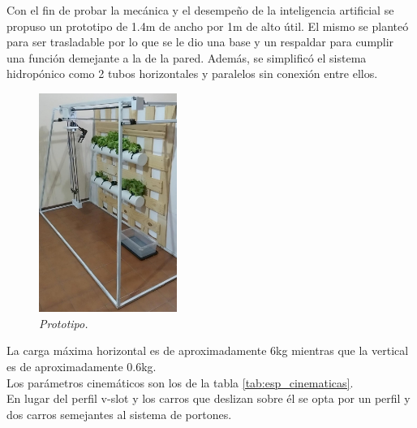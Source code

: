 Con el fin de probar la mecánica y el desempeño de la inteligencia artificial se propuso un prototipo de 1.4m de ancho por 1m de alto útil. El mismo se planteó para ser trasladable por lo que se le dio una base y un respaldar para cumplir una función demejante a la de la pared. Además, se simplificó el sistema hidropónico como 2 tubos horizontales y paralelos sin conexión entre ellos.
\begin{figure}[H]
    \centering
        \includegraphics[width=0.4\textwidth]{img/estructura.jpg}
        \caption{\textit{Prototipo.}}
        \label{fig:estructura}
\end{figure}
La carga máxima horizontal es de aproximadamente 6kg mientras que la vertical es de aproximadamente 0.6kg.\\
Los parámetros cinemáticos son los de la tabla \ref{tab:esp_cinematicas}.\\

En lugar del perfil v-slot y los carros que deslizan sobre él se opta por un perfil y dos carros semejantes al sistema de portones.\\

